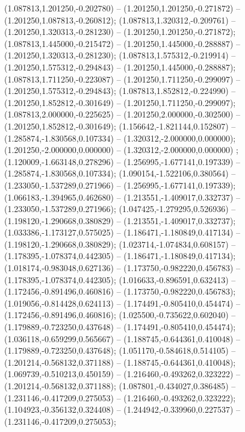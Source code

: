  (1.087813,1.201250,-0.202780) -- (1.201250,1.201250,-0.271872) -- (1.201250,1.087813,-0.260812);
 (1.087813,1.320312,-0.209761) -- (1.201250,1.320313,-0.281230) -- (1.201250,1.201250,-0.271872);
 (1.087813,1.445000,-0.215472) -- (1.201250,1.445000,-0.288887) -- (1.201250,1.320313,-0.281230);
 (1.087813,1.575312,-0.219914) -- (1.201250,1.575312,-0.294843) -- (1.201250,1.445000,-0.288887);
 (1.087813,1.711250,-0.223087) -- (1.201250,1.711250,-0.299097) -- (1.201250,1.575312,-0.294843);
 (1.087813,1.852812,-0.224990) -- (1.201250,1.852812,-0.301649) -- (1.201250,1.711250,-0.299097);
 (1.087813,2.000000,-0.225625) -- (1.201250,2.000000,-0.302500) -- (1.201250,1.852812,-0.301649);
 (1.156642,-1.821144,0.152807) -- (1.285874,-1.830568,0.107334) -- (1.320312,-2.000000,0.000000);
 (1.201250,-2.000000,0.000000) -- (1.320312,-2.000000,0.000000) ;
 (1.120009,-1.663148,0.278296) -- (1.256995,-1.677141,0.197339) -- (1.285874,-1.830568,0.107334);
 (1.090154,-1.522106,0.380564) -- (1.233050,-1.537289,0.271966) -- (1.256995,-1.677141,0.197339);
 (1.066183,-1.394965,0.462680) -- (1.213551,-1.409017,0.332737) -- (1.233050,-1.537289,0.271966);
 (1.047425,-1.279295,0.526936) -- (1.198120,-1.290668,0.380829) -- (1.213551,-1.409017,0.332737);
 (1.033386,-1.173127,0.575025) -- (1.186471,-1.180849,0.417134) -- (1.198120,-1.290668,0.380829);
 (1.023714,-1.074834,0.608157) -- (1.178395,-1.078374,0.442305) -- (1.186471,-1.180849,0.417134);
 (1.018174,-0.983048,0.627136) -- (1.173750,-0.982220,0.456783) -- (1.178395,-1.078374,0.442305);
 (1.016633,-0.896591,0.632413) -- (1.172456,-0.891496,0.460816) -- (1.173750,-0.982220,0.456783);
 (1.019056,-0.814428,0.624113) -- (1.174491,-0.805410,0.454474) -- (1.172456,-0.891496,0.460816);
 (1.025500,-0.735622,0.602040) -- (1.179889,-0.723250,0.437648) -- (1.174491,-0.805410,0.454474);
 (1.036118,-0.659299,0.565667) -- (1.188745,-0.644361,0.410048) -- (1.179889,-0.723250,0.437648);
 (1.051170,-0.584618,0.514105) -- (1.201214,-0.568132,0.371188) -- (1.188745,-0.644361,0.410048);
 (1.069739,-0.510213,0.450159) -- (1.216460,-0.493262,0.323222) -- (1.201214,-0.568132,0.371188);
 (1.087801,-0.434027,0.386485) -- (1.231146,-0.417209,0.275053) -- (1.216460,-0.493262,0.323222);
 (1.104923,-0.356132,0.324408) -- (1.244942,-0.339960,0.227537) -- (1.231146,-0.417209,0.275053);
